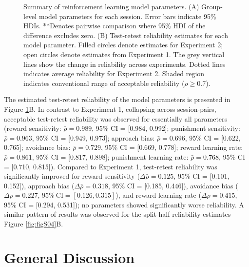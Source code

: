 \documentclass[a4paper,12pt]{article}
\begin{document}
\begin{refsection}[main]
\begin{figure}[t!]
    \centerline{}
    \caption{Summary of reinforcement learning model parameters. (A) Group-level model parameters for each session. Error bars indicate 95\% HDIs. **Denotes pairwise comparison where 95\% HDI of the difference excludes zero. (B) Test-retest reliability estimates for each model parameter. Filled circles denote estimates for Experiment 2; open circles denote estimates from Experiment 1. The grey vertical lines show the change in reliability across experiments. Dotted lines indicates average reliability for Experiment 2. Shaded region indicates conventional range of acceptable reliability ($\rho \geq 0.7$).}
    \label{fig:exp02_modeling}
\end{figure}

The estimated test-retest reliability of the model parameters is presented in Figure \ref{fig:exp02_modeling}B. In contrast to Experiment 1, collapsing across session-pairs, acceptable test-retest reliability was observed for essentially all parameters (reward sensitivity: $\bar{\rho} = 0.989$, 95\% CI = [0.984, 0.992]; punishment sensitivity: $\bar{\rho} = 0.963$, 95\% CI = [0.949, 0.973]; approach bias: $\bar{\rho} = 0.696$, 95\% CI = [0.622, 0.765]; avoidance bias: $\bar{\rho} = 0.729$, 95\% CI = [0.669, 0.778]; reward learning rate: $\bar{\rho} = 0.861$, 95\% CI = [0.817, 0.898]; punishment learning rate: $\bar{\rho} = 0.768$, 95\% CI = [0.710, 0.815]). Compared to Experiment 1, test-retest reliability was significantly improved for reward sensitivity ($\Delta\bar{\rho} = 0.125$, 95\% CI = [0.101, 0.152]), approach bias ($\Delta\bar{\rho} = 0.318$, 95\% CI = [0.185, 0.446]), avoidance bias ($\Delta\bar{\rho} = 0.227$, $95\% \ \text{CI} = [0.126, 0.315]$), and reward learning rate ($\Delta\bar{\rho} = 0.415$, 95\% CI = [0.294, 0.531]); no parameters showed significantly worse reliability. A similar pattern of results was observed for the split-half reliability estimates Figure \ref{fig:figS04}B.

\section*{General Discussion}


\end{refsection}
\end{document}

